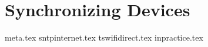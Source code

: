 \chapter{Synchronizing Devices}\label{cha:synchronization}
{meta.tex}
{sntpinternet.tex}
{tswifidirect.tex}
{inpractice.tex}

